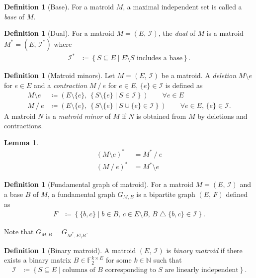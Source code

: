 \documentclass[twoside,10pt]{article}
\newtheorem{lemma}[theorem]{Lemma}
\theoremstyle{definition}
\newtheorem{definition}[theorem]{Definition}
\theoremstyle{remark}
\begin{document}
\begin{definition}[Base]
For a matroid $M$, a maximal independent set is called a \textit{base} of $M$.
\end{definition}

\begin{definition}[Dual]
For a matroid $M=(E,\,\mathcal{I})$, the \textit{dual} of $M$ is a matroid $M^*=(E,\,\mathcal{I}^*)$ where
\begin{align*}
\mathcal{I}^*&\coloneqq\left\{S\subseteq E\mid \text{$E\setminus S$ includes a base}\right\}.
\end{align*}
\end{definition}

\begin{definition}[Matroid minors]
Let $M=(E,\,\mathcal{I})$ be a matroid.
A \textit{deletion} $M\setminus e$ for $e\in E$ and a \textit{contraction} $M\mathbin{/} e$ for $e\in E,\, \{e\}\in\mathcal{I}$ is defined as 
\begin{align*}
M\setminus e&\coloneqq \left(E\setminus\{e\},\, \left\{S\setminus\{e\}\mid S\in\mathcal{I}\right\}\right)\qquad\forall e\in E\\
M\mathbin{/} e&\coloneqq \left(E\setminus\{e\},\, \left\{S\setminus\{e\}\mid S\cup\{e\}\in\mathcal{I}\right\}\right)\qquad\forall e\in E,\, \{e\}\in\mathcal{I}.
\end{align*}
A matroid $N$ is a \textit{matroid minor} of $M$ if $N$ is obtained from $M$ by deletions and contractions.
\end{definition}

\begin{lemma}
\begin{align*}
(M\setminus e)^* &= M^*\mathbin{/}e\\
(M\mathbin{/} e)^* &= M^*\setminus e
\end{align*}
\end{lemma}

\begin{definition}[Fundamental graph of matroid]
For a matroid $M=(E,\,\mathcal{I})$ and a base $B$ of $M$,
a fundamental graph $G_{M,B}$ is a bipartite graph $(E,\, F)$ defined as
\begin{align*}
F&\coloneqq\left\{\{b,c\} \mid b\in B,\, c\in E\setminus B,\, B\bigtriangleup\{b,c\}\in\mathcal{I}\right\}.
\end{align*}
\end{definition}
Note that $G_{M,B}=G_{M^*,E\setminus B}$.

\begin{definition}[Binary matroid]
A matroid $(E,\,\mathcal{I})$ is \textit{binary matroid} if there exists a binary matrix $B\in\mathbb{F}_2^{k\times E}$ for some $k\in\mathbb{N}$ such that
\begin{align*}
\mathcal{I} &\coloneqq\left\{S\subseteq E\mid \text{columns of $B$ corresponding to $S$ are linearly independent}\right\}.
\end{align*}
\end{definition}
\end{document}
